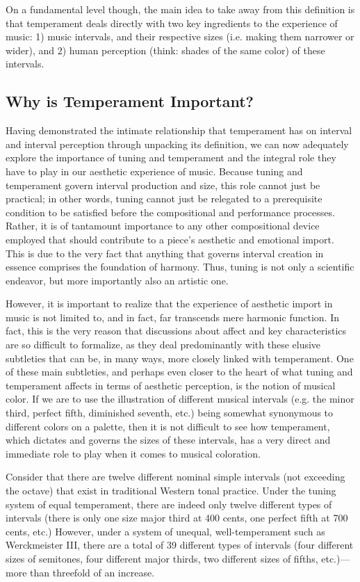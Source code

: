 On a fundamental level though, the main idea to take away from this
definition is that temperament deals directly with two key ingredients
to the experience of music: 1) music intervals, and their respective
sizes (i.e. making them narrower or wider), and 2) human perception
(think: shades of the same color) of these intervals.

\subsection{Why is Temperament
Important?}\label{why-is-temperament-important}

Having demonstrated the intimate relationship that temperament has on
interval and interval perception through unpacking its definition, we
can now adequately explore the importance of tuning and temperament and
the integral role they have to play in our aesthetic experience of
music. Because tuning and temperament govern interval production and
size, this role cannot just be practical; in other words, tuning cannot
just be relegated to a prerequisite condition to be satisfied before the
compositional and performance processes. Rather, it is of tantamount
importance to any other compositional device employed that should
contribute to a piece's aesthetic and emotional import. This is due to
the very fact that anything that governs interval creation in essence
comprises the foundation of harmony. Thus, tuning is not only a
scientific endeavor, but more importantly also an artistic one.

However, it is important to realize that the experience of aesthetic
import in music is not limited to, and in fact, far transcends mere
harmonic function. In fact, this is the very reason that discussions
about affect and key characteristics are so difficult to formalize, as
they deal predominantly with these elusive subtleties that can be, in
many ways, more closely linked with temperament. One of these main
subtleties, and perhaps even closer to the heart of what tuning and
temperament affects in terms of aesthetic perception, is the notion of
musical color. If we are to use the illustration of different musical
intervals (e.g. the minor third, perfect fifth, diminished seventh,
etc.) being somewhat synonymous to different colors on a palette, then
it is not difficult to see how temperament, which dictates and governs
the sizes of these intervals, has a very direct and immediate role to
play when it comes to musical coloration.

Consider that there are twelve different nominal simple intervals (not
exceeding the octave) that exist in traditional Western tonal practice.
Under the tuning system of equal temperament, there are indeed only
twelve different types of intervals (there is only one size major third
at 400 cents, one perfect fifth at 700 cents, etc.) However, under a
system of unequal, well-temperament such as Werckmeister III, there are
a total of 39 different types of intervals (four different sizes of
semitones, four different major thirds, two different sizes of fifths,
etc.)---more than threefold of an increase.

